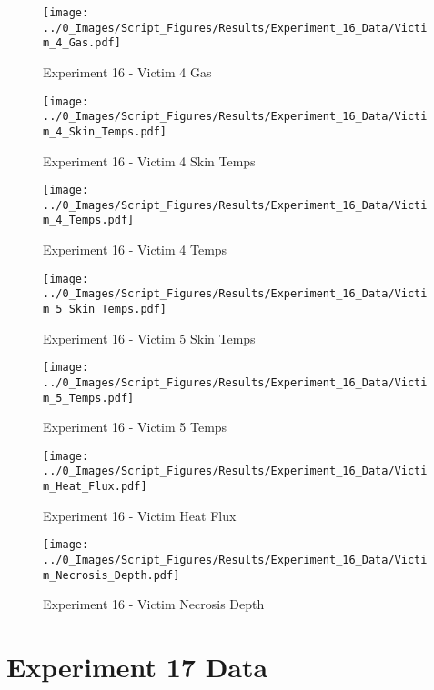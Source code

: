 	\begin{figure}[H]
		\centering
		\texttt{[image: ../0\_Images/Script\_Figures/Results/Experiment\_16\_Data/Victim\_4\_Gas.pdf]}
		\caption[]{Experiment 16 - Victim 4 Gas}
	\end{figure}
 
	\clearpage

	\begin{figure}[H]
		\centering
		\texttt{[image: ../0\_Images/Script\_Figures/Results/Experiment\_16\_Data/Victim\_4\_Skin\_Temps.pdf]}
		\caption[]{Experiment 16 - Victim 4 Skin Temps}
	\end{figure}
 

	\begin{figure}[H]
		\centering
		\texttt{[image: ../0\_Images/Script\_Figures/Results/Experiment\_16\_Data/Victim\_4\_Temps.pdf]}
		\caption[]{Experiment 16 - Victim 4 Temps}
	\end{figure}
 
	\clearpage

	\begin{figure}[H]
		\centering
		\texttt{[image: ../0\_Images/Script\_Figures/Results/Experiment\_16\_Data/Victim\_5\_Skin\_Temps.pdf]}
		\caption[]{Experiment 16 - Victim 5 Skin Temps}
	\end{figure}
 

	\begin{figure}[H]
		\centering
		\texttt{[image: ../0\_Images/Script\_Figures/Results/Experiment\_16\_Data/Victim\_5\_Temps.pdf]}
		\caption[]{Experiment 16 - Victim 5 Temps}
	\end{figure}
 
	\clearpage

	\begin{figure}[H]
		\centering
		\texttt{[image: ../0\_Images/Script\_Figures/Results/Experiment\_16\_Data/Victim\_Heat\_Flux.pdf]}
		\caption[]{Experiment 16 - Victim Heat Flux}
	\end{figure}
 

	\begin{figure}[H]
		\centering
		\texttt{[image: ../0\_Images/Script\_Figures/Results/Experiment\_16\_Data/Victim\_Necrosis\_Depth.pdf]}
		\caption[]{Experiment 16 - Victim Necrosis Depth}
	\end{figure}
 
	\clearpage

\clearpage		\large
\section{Experiment 17 Data} \label{App:Exp17Results} 

